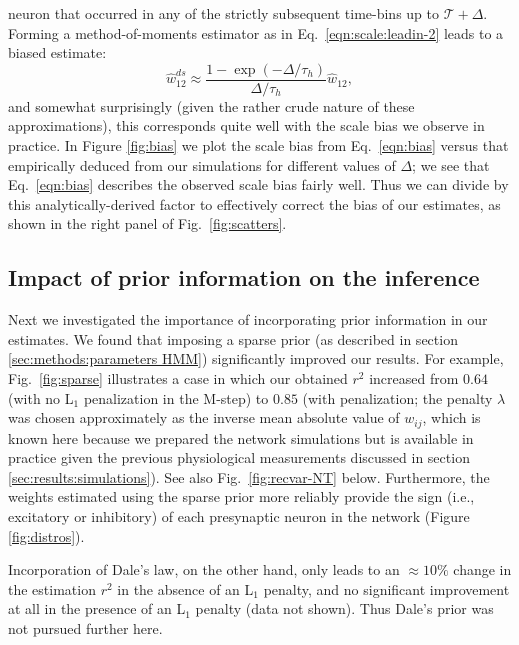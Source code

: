 \documentclass[aoas,preprint]{imsart}
\begin{document}
neuron that occurred in any of the strictly subsequent time-bins up to
$\mathcal{T} + \Delta$.  Forming a method-of-moments estimator as in
Eq.~\ref{eqn:scale:leadin-2} leads to a biased estimate:
\begin{equation}\label{eqn:bias}
\hat w_{12}^{ds}\approx \frac{1-\exp(-\Delta/\tau_h)}{\Delta/\tau_h}
\hat w_{12},
\end{equation}
and somewhat surprisingly (given the rather crude nature of these
approximations), this corresponds quite well with the scale bias we
observe in practice.  In Figure \ref{fig:bias} we plot the scale bias
from Eq.~\ref{eqn:bias} versus that empirically deduced from our
simulations for different values of $\Delta$; we see that
Eq.~\ref{eqn:bias} describes the observed scale bias fairly well.
Thus we can divide by this analytically-derived factor to effectively
correct the bias of our estimates, as shown in the right panel of
Fig.~\ref{fig:scatters}.


\subsection{Impact of prior information on the inference}

Next we investigated the importance of incorporating prior information
in our estimates.  We found that imposing a sparse prior (as described
in section \ref{sec:methods:parameters HMM}) significantly improved
our results.  For example, Fig.~\ref{fig:sparse} illustrates a case in
which our obtained $r^2$ increased from $0.64$ (with no L$_1$
penalization in the M-step) to $0.85$ (with penalization; the penalty
$\lambda$ was chosen approximately as the inverse mean absolute value
of $w_{ij}$, which is known here because we prepared the network
simulations but is available in practice given the previous
physiological measurements discussed in section
\ref{sec:results:simulations}).  See also Fig.~\ref{fig:recvar-NT}
below.  Furthermore, the weights estimated using the sparse prior more
reliably provide the sign (i.e., excitatory or inhibitory) of each
presynaptic neuron in the network (Figure \ref{fig:distros}).

Incorporation of Dale's law, on the other hand, only leads to an
$\approx 10\%$ change in the estimation $r^2$ in the absence of an
L$_1$ penalty, and no significant improvement at all in the presence
of an L$_1$ penalty (data not shown).  Thus Dale's prior was not
pursued further here.
\end{document}
